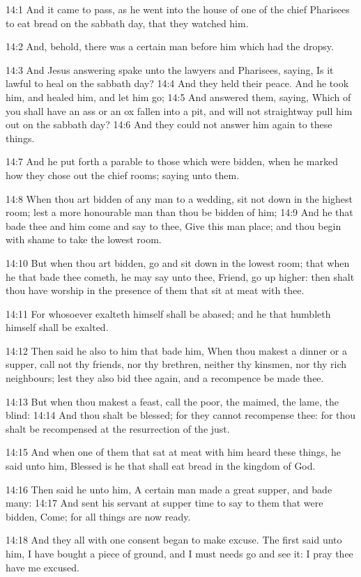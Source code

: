 14:1 And it came to pass, as he went into the house of one of the
chief Pharisees to eat bread on the sabbath day, that they watched
him.

14:2 And, behold, there was a certain man before him which had the
dropsy.

14:3 And Jesus answering spake unto the lawyers and Pharisees, saying,
Is it lawful to heal on the sabbath day?  14:4 And they held their
peace. And he took him, and healed him, and let him go; 14:5 And
answered them, saying, Which of you shall have an ass or an ox fallen
into a pit, and will not straightway pull him out on the sabbath day?
14:6 And they could not answer him again to these things.

14:7 And he put forth a parable to those which were bidden, when he
marked how they chose out the chief rooms; saying unto them.

14:8 When thou art bidden of any man to a wedding, sit not down in the
highest room; lest a more honourable man than thou be bidden of him;
14:9 And he that bade thee and him come and say to thee, Give this man
place; and thou begin with shame to take the lowest room.

14:10 But when thou art bidden, go and sit down in the lowest room;
that when he that bade thee cometh, he may say unto thee, Friend, go
up higher: then shalt thou have worship in the presence of them that
sit at meat with thee.

14:11 For whosoever exalteth himself shall be abased; and he that
humbleth himself shall be exalted.

14:12 Then said he also to him that bade him, When thou makest a
dinner or a supper, call not thy friends, nor thy brethren, neither
thy kinsmen, nor thy rich neighbours; lest they also bid thee again,
and a recompence be made thee.

14:13 But when thou makest a feast, call the poor, the maimed, the
lame, the blind: 14:14 And thou shalt be blessed; for they cannot
recompense thee: for thou shalt be recompensed at the resurrection of
the just.

14:15 And when one of them that sat at meat with him heard these
things, he said unto him, Blessed is he that shall eat bread in the
kingdom of God.

14:16 Then said he unto him, A certain man made a great supper, and
bade many: 14:17 And sent his servant at supper time to say to them
that were bidden, Come; for all things are now ready.

14:18 And they all with one consent began to make excuse. The first
said unto him, I have bought a piece of ground, and I must needs go
and see it: I pray thee have me excused.

